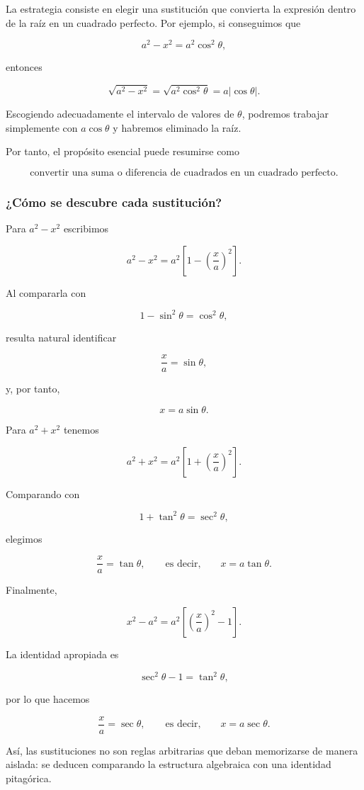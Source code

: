 La estrategia consiste en elegir una sustitución que convierta la expresión
dentro de la raíz en un cuadrado perfecto. Por ejemplo, si conseguimos que

\[
a^2-x^2=a^2\cos^2\theta,
\]

entonces

\[
\sqrt{a^2-x^2}=\sqrt{a^2\cos^2\theta}=a|\cos\theta|.
\]

Escogiendo adecuadamente el intervalo de valores de $\theta$, podremos
trabajar simplemente con $a\cos\theta$ y habremos eliminado la raíz.

Por tanto, el propósito esencial puede resumirse como

\[
\boxed{\text{convertir una suma o diferencia de cuadrados en un cuadrado perfecto}.}
\]

\subsubsection*{¿Cómo se descubre cada sustitución?}

Para $a^2-x^2$ escribimos

\[
a^2-x^2=a^2\left[1-\left(\frac{x}{a}\right)^2\right].
\]

Al compararla con

\[
1-\sin^2\theta=\cos^2\theta,
\]

resulta natural identificar

\[
\frac{x}{a}=\sin\theta,
\]

y, por tanto,

\[
\boxed{x=a\sin\theta}.
\]

Para $a^2+x^2$ tenemos

\[
a^2+x^2=a^2\left[1+\left(\frac{x}{a}\right)^2\right].
\]

Comparando con

\[
1+\tan^2\theta=\sec^2\theta,
\]

elegimos

\[
\frac{x}{a}=\tan\theta,
\qquad\text{es decir,}\qquad
\boxed{x=a\tan\theta}.
\]

Finalmente,

\[
x^2-a^2=a^2\left[\left(\frac{x}{a}\right)^2-1\right].
\]

La identidad apropiada es

\[
\sec^2\theta-1=\tan^2\theta,
\]

por lo que hacemos

\[
\frac{x}{a}=\sec\theta,
\qquad\text{es decir,}\qquad
\boxed{x=a\sec\theta}.
\]

Así, las sustituciones no son reglas arbitrarias que deban memorizarse de
manera aislada: se deducen comparando la estructura algebraica con una
identidad pitagórica.

